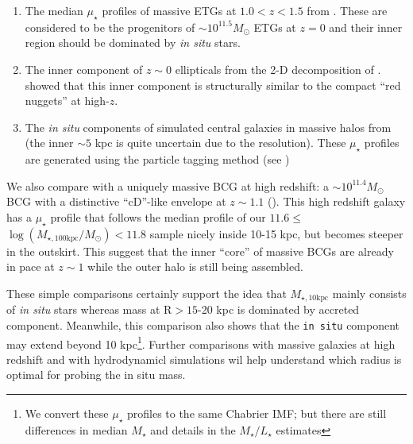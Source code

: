 \documentclass[a4paper,fleqn,usenatbib]{mnras}
\def\mstar{{$M_{\star}$}}
\def\minn{{$M_{\star,10\mathrm{kpc}}$}}
\def\logmtot{{$\log (M_{\star,100\mathrm{kpc}}/M_{\odot})$}}
\def\m2l{{$M_{\star}/L_{\star}$}}
\def\mden{{$\mu_{\star}$}}
\begin{document}
    \begin{enumerate}
        
        \item The median \mden{} profiles of massive ETGs at $1.0 < z < 1.5$ from
            \citealt{Patel2013}. These are considered to be the progenitors of 
            ${\sim} 10^{11.5} M_{\odot}$ ETGs at $z=0$ and their inner region 
            should be dominated by \textit{in situ} stars. 
    
        \item The inner component of $z{\sim} 0$ ellipticals from the 2-D 
            decomposition of \citet{Huang2013a}. \citet{Huang2013b} showed 
            that this inner component is structurally similar to the compact ``red nuggets'' at  high-$z$. 
        \item The \textit{in situ} components of simulated central galaxies in 
            massive halos from \citet{Cooper2013} (the inner ${\sim} 5$ kpc is 
            quite uncertain due to the resolution).  
            These \mden{} profiles are generated using the particle tagging 
            method (see \citealt{Cooper2010})
    
    \end{enumerate}

    We also compare with a uniquely massive BCG at high redshift: 
    a ${\sim} 10^{11.4} M_{\odot}$ BCG with a distinctive ``cD''-like envelope at 
    $z{\sim} 1.1$ (\citealt{Liu2013}).  This high redshift galaxy has a \mden{} profile that follows the median profile of our $11.6\leq$\logmtot{}$<11.8$ sample nicely inside 10-15 kpc, but becomes steeper in the outskirt. This suggest that the  inner ``core'' of massive BCGs are already in pace at $z{\sim} 1$ while the outer halo is still being assembled. 

    These simple comparisons certainly support the idea that \minn{} mainly consists of 
    \textit{in situ} stars whereas mass at $\mathrm{R} > 15$-20 kpc is dominated by accreted 
    component.   Meanwhile, this comparison also shows that the \texttt{in situ} component may extend beyond 10 kpc\footnote{We convert these \mden{} profiles to the same 
    Chabrier IMF; but there are still differences in median \mstar{} and 
    details in the \m2l{} estimates}. Further comparisons with massive galaxies at high redshift and with hydrodynamicl simulations wil help understand which radius is optimal for probing the in situ mass.
    
    
    
\end{document}
